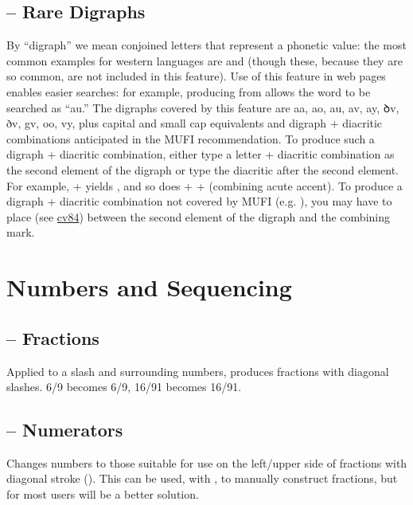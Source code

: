 \subsection{ – Rare
Digraphs}\hypertarget{ss17}{}
By “digraph” we mean conjoined letters that represent a phonetic value: the most common examples
for western languages are \textex{{\ae}} and \textex{{\oe}} (though these, because they
are so common, are not included in this feature). Use of this feature in web pages enables easier searches: for
example, producing  from
 allows the word to be
searched as “{\th}au.” The digraphs covered by this feature are \textcolor[rgb]{0.5529412,0.15686275,0.11764706}{%
aa, ao, au, av, ay, ꝺv, ðv, gv, oo, vy,} plus capital and small cap
equivalents and digraph + 
diacritic combinations anticipated in the
MUFI recommendation. To produce such a digraph + diacritic combination, either type a letter + diacritic combination as
the second element of the digraph or type the diacritic after the second element. For example,
 +  yields , and so does
 +  +  (combining acute accent). To produce a digraph +
diacritic combination not covered by MUFI (e.g. ), you may have to place 
 (see \hyperlink{cv84}{cv84}) between the second element of the digraph and the combining mark.

\section{Numbers and Sequencing}
\subsection{ – Fractions}
Applied to a slash and surrounding numbers, produces fractions with diagonal
slashes. 6/9 becomes {6/9}, 16/91 becomes {16/91}.

\subsection{ – Numerators}
Changes numbers to those suitable for use on the left/upper side of fractions
with diagonal stroke (). This can be used, with , to manually construct
fractions, but for most users  will be a better solution.

